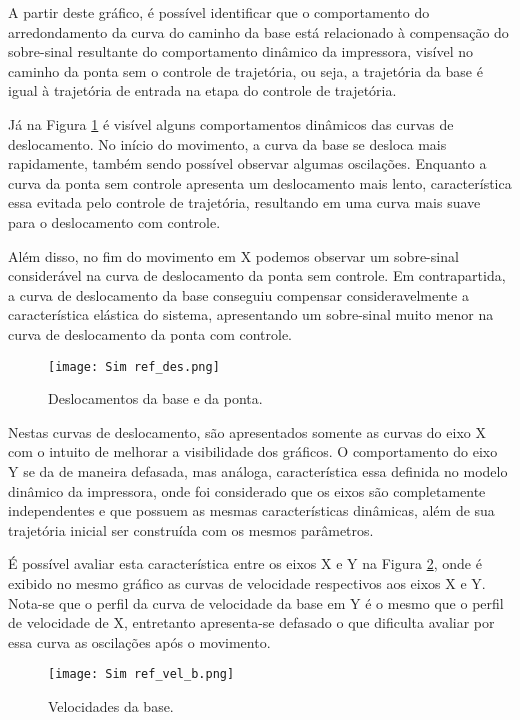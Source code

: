 A partir deste gráfico, é possível identificar que o comportamento do arredondamento da curva do caminho da base está relacionado à compensação do sobre-sinal resultante do comportamento dinâmico da impressora, visível no caminho da ponta sem o controle de trajetória, ou seja, a trajetória da base é igual à trajetória de entrada na etapa do controle de trajetória.

Já na Figura \ref{fig:ref_des} é visível alguns comportamentos dinâmicos das curvas de deslocamento. No início do movimento, a curva da base se desloca mais rapidamente, também sendo possível observar algumas oscilações. Enquanto a curva da ponta sem controle apresenta um deslocamento mais lento, característica essa evitada pelo controle de trajetória, resultando em uma curva mais suave para o deslocamento com controle.

Além disso, no fim do movimento em X podemos observar um sobre-sinal considerável na curva de deslocamento da ponta sem controle. Em contrapartida, a curva de deslocamento da base conseguiu compensar consideravelmente a característica elástica do sistema, apresentando um sobre-sinal muito menor na curva de deslocamento da ponta com controle.

\begin{figure}[H]
    \centering
    \caption{Deslocamentos da base e da ponta.}
    \texttt{[image: Sim ref\_des.png]}

    \label{fig:ref_des}
\end{figure}

Nestas curvas de deslocamento, são apresentados somente as curvas do eixo X com o intuito de melhorar a visibilidade dos gráficos. O comportamento do eixo Y se da de maneira defasada, mas análoga, característica essa definida no modelo dinâmico da impressora, onde foi considerado que os eixos são completamente independentes e que possuem as mesmas características dinâmicas, além de sua trajetória inicial ser construída com os mesmos parâmetros.

É possível avaliar esta característica entre os eixos X e Y na Figura \ref{fig:ref_vel_b}, onde é exibido no mesmo gráfico as curvas de velocidade respectivos aos eixos X e Y. Nota-se que o perfil da curva de velocidade da base em Y é o mesmo que o perfil de velocidade de X, entretanto apresenta-se defasado o que dificulta avaliar por essa curva as oscilações após o movimento.

\begin{figure}[H]
    \centering
    \caption{Velocidades da base.}
    \texttt{[image: Sim ref\_vel\_b.png]}

    \label{fig:ref_vel_b}
\end{figure}

